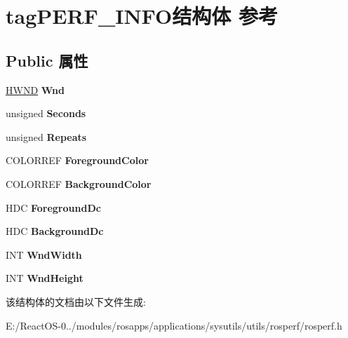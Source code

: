 \hypertarget{structtag_p_e_r_f___i_n_f_o}{}\section{tag\+P\+E\+R\+F\+\_\+\+I\+N\+F\+O结构体 参考}
\label{structtag_p_e_r_f___i_n_f_o}
\subsection*{Public 属性}
\begin{DoxyCompactItemize}
\item 
\mbox{\label{structtag_p_e_r_f___i_n_f_o_a9dad7a0790ffe9319ca2093a259fe0af}} 
\hyperlink{interfacevoid}{H\+W\+ND} {\bfseries Wnd}
\item 
\mbox{\label{structtag_p_e_r_f___i_n_f_o_a45fa69d27a9e666eb191f1b6d6a540e3}} 
unsigned {\bfseries Seconds}
\item 
\mbox{\label{structtag_p_e_r_f___i_n_f_o_aef5fab136c56d7943db45c64fb609c13}} 
unsigned {\bfseries Repeats}
\item 
\mbox{\label{structtag_p_e_r_f___i_n_f_o_a7cbce24ff218f2e774e851fd0a7fed31}} 
C\+O\+L\+O\+R\+R\+EF {\bfseries Foreground\+Color}
\item 
\mbox{\label{structtag_p_e_r_f___i_n_f_o_aa5b93fe23bf8af8ee3cfebf62e8db7a3}} 
C\+O\+L\+O\+R\+R\+EF {\bfseries Background\+Color}
\item 
\mbox{\label{structtag_p_e_r_f___i_n_f_o_aba151be60f5ab5c6ac26a94d56c61c9a}} 
H\+DC {\bfseries Foreground\+Dc}
\item 
\mbox{\label{structtag_p_e_r_f___i_n_f_o_a89e7dd0ce70f09525996088159b7d844}} 
H\+DC {\bfseries Background\+Dc}
\item 
\mbox{\label{structtag_p_e_r_f___i_n_f_o_ac23915f9d49ffbde36e9de12c9eaac94}} 
I\+NT {\bfseries Wnd\+Width}
\item 
\mbox{\label{structtag_p_e_r_f___i_n_f_o_a52e97a208d8d905d2f317497ba249738}} 
I\+NT {\bfseries Wnd\+Height}
\end{DoxyCompactItemize}


该结构体的文档由以下文件生成\+:\begin{DoxyCompactItemize}
\item 
E\+:/\+React\+O\+S-\/0../modules/rosapps/applications/sysutils/utils/rosperf/rosperf.\+h\end{DoxyCompactItemize}
